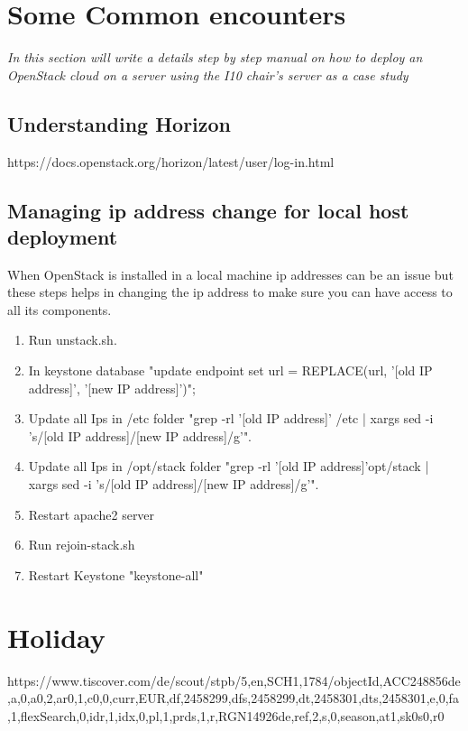 \begin{appendices}
\chapter{Some Common encounters}\label{chapter:appendix_A}
\textit{In this section will write a details step by step manual on how to deploy an OpenStack cloud on a server using the I10 chair's server as a case study}

\section*{Understanding Horizon}
https://docs.openstack.org/horizon/latest/user/log-in.html

\section*{Managing ip address change for local host deployment}
When OpenStack is installed in a local machine ip addresses can be an issue but these steps helps in changing the ip address to make sure you can have access to all its components.
\begin{enumerate}
\item Run unstack.sh.
\item In keystone database "update endpoint set url = REPLACE(url, '[old IP address]', '[new IP address]')";
\item Update all Ips in /etc folder "grep -rl '[old IP address]' /etc | xargs sed -i 's/[old IP address]/[new IP address]/g'".
\item Update all Ips in /opt/stack folder "grep -rl '[old IP address]'opt/stack | xargs sed -i 's/[old IP address]/[new IP address]/g'".
\item Restart apache2 server
\item Run rejoin-stack.sh
\item Restart Keystone "keystone-all"
\end{enumerate}

\chapter{Holiday}
https://www.tiscover.com/de/scout/stpb/5,en,SCH1,1784/objectId,ACC248856de,a,0,a0,2,ar0,1,c0,0,curr,EUR,df,2458299,dfs,2458299,dt,2458301,dts,2458301,e,0,fa,1,flexSearch,0,idr,1,idx,0,pl,1,prds,1,r,RGN14926de,ref,2,s,0,season,at1,sk0s0,r0%



\end{appendices}